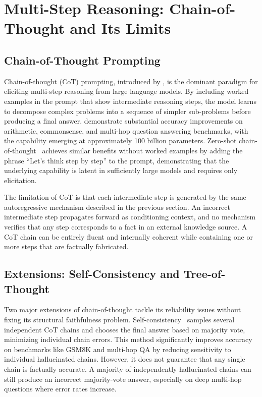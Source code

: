 \section{Multi-Step Reasoning: Chain-of-Thought and Its Limits}
\label{sec:cot}

\subsection{Chain-of-Thought Prompting}

Chain-of-thought (CoT) prompting, introduced by \citet{wei2022cot}, is the dominant paradigm for eliciting multi-step reasoning from large language models. By including worked examples in the prompt that show intermediate reasoning steps, the model learns to decompose complex problems into a sequence of simpler sub-problems before producing a final answer. \citet{wei2022cot} demonstrate substantial accuracy improvements on arithmetic, commonsense, and multi-hop question answering benchmarks, with the capability emerging at approximately 100 billion parameters. Zero-shot chain-of-thought~\citep{kojima2022zero} achieves similar benefits without worked examples by adding the phrase ``Let's think step by step'' to the prompt, demonstrating that the underlying capability is latent in sufficiently large models and requires only elicitation.

The limitation of CoT is that each intermediate step is generated by the same autoregressive mechanism described in the previous section. An incorrect intermediate step propagates forward as conditioning context, and no mechanism verifies that any step corresponds to a fact in an external knowledge source. A CoT chain can be entirely fluent and internally coherent while containing one or more steps that are factually fabricated.

\subsection{Extensions: Self-Consistency and Tree-of-Thought}

Two major extensions of chain-of-thought tackle its reliability issues without fixing its structural faithfulness problem. Self-consistency~\citep{wang2023selfconsistency} samples several independent CoT chains and chooses the final answer based on majority vote, minimizing individual chain errors. This method significantly improves accuracy on benchmarks like GSM8K and multi-hop QA by reducing sensitivity to individual hallucinated chains. However, it does not guarantee that any single chain is factually accurate. A majority of independently hallucinated chains can still produce an incorrect majority-vote answer, especially on deep multi-hop questions where error rates increase.

